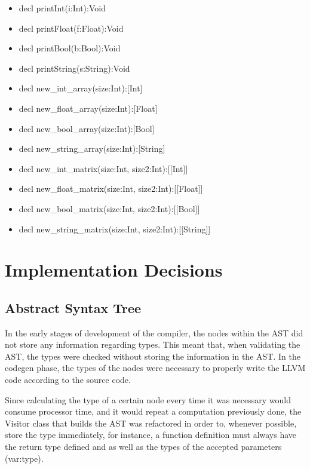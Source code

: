 \documentclass[12pt]{article}
\begin{document}
\begin{itemize}
		\item decl printInt(i:Int):Void
        \item decl printFloat(f:Float):Void
        \item decl printBool(b:Bool):Void
        \item decl printString(s:String):Void
        \item decl new\_int\_array(size:Int):[Int]
        \item decl new\_float\_array(size:Int):[Float]
        \item decl new\_bool\_array(size:Int):[Bool]
        \item decl new\_string\_array(size:Int):[String]
        \item decl new\_int\_matrix(size:Int, size2:Int):[[Int]]
        \item decl new\_float\_matrix(size:Int, size2:Int):[[Float]]
        \item decl new\_bool\_matrix(size:Int, size2:Int):[[Bool]]
        \item decl new\_string\_matrix(size:Int, size2:Int):[[String]]       

\end{itemize}

\newpage


\section{Implementation Decisions}
\subsection{Abstract Syntax Tree}
In the early stages of development of the compiler, the nodes within the AST did not store any information regarding types. This meant that, when validating the AST, the types were checked without storing the information in the AST. In the codegen phase, the types of the nodes were necessary to properly write the LLVM code according to the source code.

Since calculating the type of a certain node every time it was necessary would consume processor time, and it would repeat a computation previously done, the Visitor class that builds the AST was refactored in order to, whenever possible, store the type immediately, for instance, a function definition must always have the return type defined and as well as the types of the accepted parameters (var:type).
\end{document}
